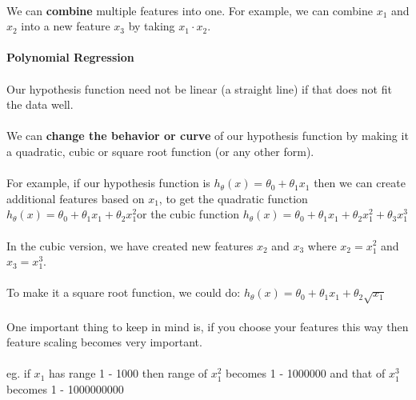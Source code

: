 \documentclass{article}
\begin{document}
\begin{CJK}{UTF8}{gbsn}
\paragraph{}
We can \textbf{combine} multiple features into one. For example, we can combine $x_{1}$ and $x_{2}$ into a new feature $x_{3}$ by taking $x_{1}⋅x_{2}$.
\paragraph{}
\textbf{Polynomial Regression}
\paragraph{}
Our hypothesis function need not be linear (a straight line) if that does not fit the data well.
\paragraph{}
We can \textbf{change the behavior or curve} of our hypothesis function by making it a quadratic, cubic or square root function (or any other form).
\paragraph{}
For example, if our hypothesis function is $h_{\theta}(x)=\theta_{0}+\theta_{1}x_{1}$ then we can create additional features based on $x_{1}$, to get the quadratic function $h_{\theta}(x)=\theta_{0}+\theta_{1}x_{1}+\theta_{2}x_{1}^{2} $or the cubic function $h_{\theta}(x)=\theta_{0}+\theta_{1}x_{1}+\theta_{2}x_{1}^{2}+\theta_{3}x_{1}^{3}$
\paragraph{}
In the cubic version, we have created new features $x_{2}$ and $x_{3}$ where $x_{2}=x_{1}^{2}$ and $x_{3}=x_{1}^{3}$.
\paragraph{}
To make it a square root function, we could do: $h_{\theta}(x)=\theta_{0}+\theta_{1}x_{1}+\theta_{2}\sqrt{x_{1}}$
\paragraph{}
One important thing to keep in mind is, if you choose your features this way then feature scaling becomes very important.
\paragraph{}
eg. if $x_{1}$ has range 1 - 1000 then range of $x_{1}^{2}$ becomes 1 - 1000000 and that of $x_{1}^{3}$ becomes 1 - 1000000000

\end{CJK}
\end{document}

